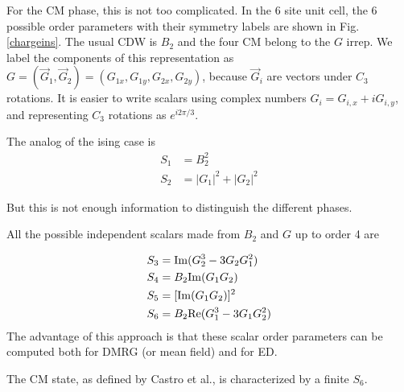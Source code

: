 \documentclass[aps,prx,10pt,twocolumn,floatfix,superscriptaddress,showpacs,numerical,footinbib]{revtex4-1}
\begin{document}
For the CM phase, this is not too complicated. In the 6 site unit cell, the 6 possible order parameters with their symmetry labels are shown in Fig.\ref{chargeins}. The usual CDW is $B_2$ and the four CM belong to the $G$ irrep. We label the components of this representation as $G = (\vec G_1 , \vec G_2) = (G_{1x},G_{1y},G_{2x},G_{2y})$, because $\vec G_i$ are vectors under $C_3$ rotations. It is easier to write scalars using complex numbers $G_i = G_{i,x}+ i G_{i,y}$, and representing $C_3$ rotations as $e^{i2\pi/3}$. 

The analog of the ising case is 
\begin{align}
S_1 &= B_2^2 \\
S_2 &= |G_1|^2+|G_2|^2 
\end{align}

But this is not enough information to distinguish the different phases. 

All the possible independent scalars made from $B_2$ and $G$ up to order 4 are



\begin{align}
S_3 &= {\rm Im}(G_2^3-3G_2 G_1^2)  \\
S_4 &= B_2 {\rm Im}(G_1G_2) \\
S_5 &= [{\rm Im}(G_1G_2)]^2 \\
S_6 &= B_2{\rm Re}(G_1^3-3G_1 G_2^2)
\end{align}
The advantage of this approach is that these scalar order parameters can be computed both for DMRG (or mean field) and for ED. 

The CM state, as defined by Castro et al., is characterized by a finite $S_6$. 



\end{document}

